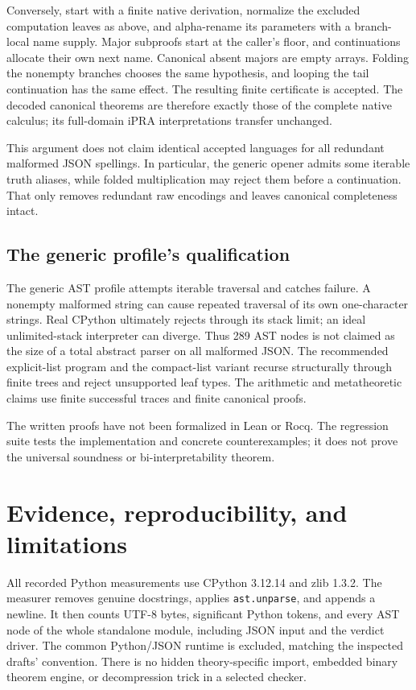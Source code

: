 \documentclass[11pt]{article}
\theoremstyle{definition}\newtheorem{definition}[theorem]{Definition}
\begin{document}
Conversely, start with a finite native derivation, normalize the
excluded computation leaves as above, and alpha-rename its parameters
with a branch-local name supply. Major subproofs start at the caller's
floor, and continuations allocate their own next name. Canonical absent
majors are empty arrays. Folding the nonempty branches chooses the same
hypothesis, and looping the tail continuation has the same effect.
The resulting finite certificate is accepted. The decoded canonical
theorems are therefore exactly those of the complete native calculus;
its full-domain iPRA interpretations transfer unchanged.

This argument does not claim identical accepted languages for all
redundant malformed JSON spellings. In particular, the generic opener
admits some iterable truth aliases, while folded multiplication may
reject them before a continuation. That only removes redundant raw
encodings and leaves canonical completeness intact.

\subsection{The generic profile's qualification}
The generic AST profile attempts iterable traversal and catches failure.
A nonempty malformed string can cause repeated traversal of its own
one-character strings. Real CPython ultimately rejects through its
stack limit; an ideal unlimited-stack interpreter can diverge. Thus
289 AST nodes is not claimed as the size of a total abstract parser on
all malformed JSON. The recommended explicit-list program and the
compact-list variant recurse structurally through finite trees and
reject unsupported leaf types. The arithmetic and metatheoretic
claims use finite successful traces and finite canonical proofs.

The written proofs have not been formalized in Lean or Rocq. The
regression suite tests the implementation and concrete counterexamples;
it does not prove the universal soundness or bi-interpretability theorem.


\section{Evidence, reproducibility, and limitations}
\label{sec:evidence}
All recorded Python measurements use CPython 3.12.14 and zlib 1.3.2.
The measurer removes genuine docstrings, applies \texttt{ast.unparse},
and appends a newline. It then counts UTF-8 bytes, significant Python
tokens, and every AST node of the whole standalone module, including
JSON input and the verdict driver. The common Python/JSON runtime is
excluded, matching the inspected drafts' convention. There is no hidden
theory-specific import, embedded binary theorem engine, or decompression
trick in a selected checker.
\end{document}
